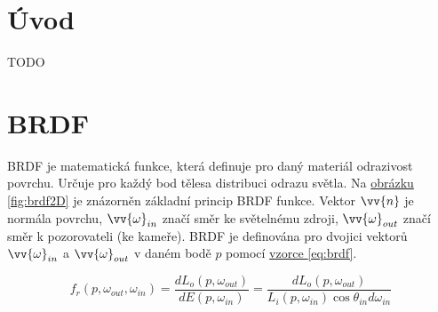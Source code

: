 \documentclass[czech,master,dept460,male,cpp,cpdeclaration]{diploma}
\begin{document}
\MakeTitlePages

\section{Úvod}
TODO
\clearpage
\section{BRDF}
BRDF je matematická funkce, která definuje pro daný materiál odrazivost povrchu. Určuje pro každý bod tělesa distribuci odrazu světla. Na \hyperref[fig:brdf2D]{obrázku \ref{fig:brdf2D}} je znázorněn základní princip BRDF funkce. Vektor $\vv{n}$ je normála povrchu, $\vv{\omega}_{in}$ značí směr ke světelnému zdroji, $\vv{\omega}_{out}$ značí směr k pozorovateli (ke kameře). BRDF je definována pro dvojici vektorů  $\vv{\omega}_{in}$ a $\vv{\omega}_{out}$ v daném bodě $p$ pomocí \hyperref[eq:brdf]{vzorce \ref{eq:brdf}}. 

\begin{equation} \label{eq:brdf}
    f_r\left(p,\omega_{out},\omega_{in}\right) = \frac{dL_o\left(p, \omega_{out}\right)}{dE\left(p, \omega_{in}\right)} = \frac{dL_o\left(p, \omega_{out}\right)}{L_i\left(p, \omega_{in}\right)\cos \theta_{in}d\omega_{in}}
\end{equation}
\end{document}
